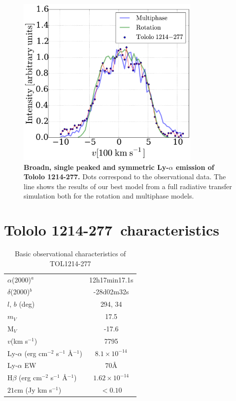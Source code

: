 \documentclass[a4paper, usenatbib, 12pt]{article}
\newcommand{\tol}{Tololo 1214-277}
\begin{document}
{\begin{figure}
\begin{center}
\includegraphics[width=0.8\textwidth]{CLARA-TOL-main.pdf}
\caption{{\bf Broadn, single peaked and symmetric Ly-$\alpha$ emission of \tol.}
  Dots correspond to the observational data. The line shows the results
of our best model from a full radiative transfer simulation both for the rotation and multiphase models.}
\end{center}
\end{figure}

{}


\newpage 

\section*{\tol\ characteristics}


\begin{table}
\begin{center}
\begin{tabular}{lc}
$\alpha$(2000)$^{a}$ & 12h17min17.1s\\
$\delta$(2000)$^{b}$ & -28d02m32s\\
$l$, $b$ (deg) & 294, 34\\
$m_V$ & 17.5\\
  M$_V$ & -17.6\\ 
$v$(km s$^{-1}$) & 7795\\
Ly-$\alpha$ (erg cm$^{-2}$ s$^{-1}$ \AA$^{-1}$)& $8.1\times 10^{-14}$ \\
Ly-$\alpha$ EW & $70$\AA\\
H$\beta$ (erg cm$^{-2}$ s$^{-1}$ \AA$^{-1}$) & $1.62\times 10^{-14}$ \\
$21$cm (Jy km s$^{-1}$)& $<0.10$ \\
\end{tabular}
\end{center}
\caption{Basic observational characteristics of TOL1214-277
  \cite{Thuan97}\\} 
\end{table}

}
\end{document}
